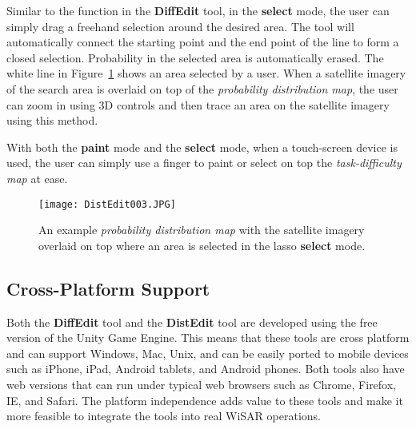 Similar to the function in the \textbf{DiffEdit} tool, in the \textbf{select} mode, the user can simply drag a freehand selection around the desired area. The tool will automatically connect the starting point and the end point of the line to form a closed selection. Probability in the selected area is automatically erased. The white line in Figure~\ref{DistEdit003} shows an area selected by a user. When a satellite imagery of the search area is overlaid on top of the \textit{probability distribution map}, the user can zoom in using 3D controls and then trace an area on the satellite imagery using this method.

With both the \textbf{paint} mode and the \textbf{select} mode, when a touch-screen device is used, the user can simply use a finger to paint or select on top the \textit{task-difficulty map} at ease.

\begin{figure}[!ht]
\centering
\texttt{[image: DistEdit003.JPG]}
\caption{An example \textit{probability distribution map} with the satellite imagery overlaid on top where an area is selected in the lasso \textbf{select} mode.}
\label{DistEdit003}
\end{figure}

\subsection{Cross-Platform Support}

Both the \textbf{DiffEdit} tool and the \textbf{DistEdit} tool are developed using the free version of the Unity Game Engine. This means that these tools are cross platform and can support Windows, Mac, Unix, and can be easily ported to mobile devices such as iPhone, iPad, Android tablets, and Android phones. Both tools also have web versions that can run under typical web browsers such as Chrome, Firefox, IE, and Safari. The platform independence adds value to these tools and make it more feasible to integrate the tools into real WiSAR operations.